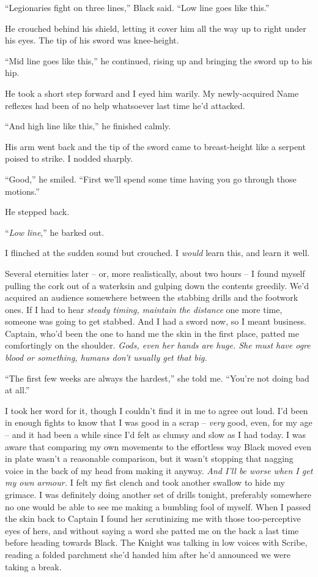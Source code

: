\documentclass[12pt, openany]{book}
\begin{document}
“Legionaries fight on three lines,” Black said. “Low line goes like this.”

He crouched behind his shield, letting it cover him all the way up to right under his eyes. The tip of his sword was knee-height.

“Mid line goes like this,” he continued, rising up and bringing the sword up to his hip.

He took a short step forward and I eyed him warily. My newly-acquired Name reflexes had been of no help whatsoever last time he’d attacked.

“And high line like this,” he finished calmly.

His arm went back and the tip of the sword came to breast-height like a serpent poised to strike. I nodded sharply.

“Good,” he smiled. “First we’ll spend some time having you go through those motions.”

He stepped back.

“\textit{Low line},” he barked out.

I flinched at the sudden sound but crouched. I \textit{would} learn this, and learn it well.

Several eternities later – or, more realistically, about two hours – I found myself pulling the cork out of a waterksin and gulping down the contents greedily. We’d acquired an audience somewhere between the stabbing drills and the footwork ones. If I had to hear \textit{steady timing, maintain the distance} one more time, someone was going to get stabbed. And I had a sword now, so I meant business. Captain, who’d been the one to hand me the skin in the first place, patted me comfortingly on the shoulder.\textit{ Gods, even her hands are huge. She must have ogre blood or something, humans don’t usually get that big.}

“The first few weeks are always the hardest,” she told me. “You’re not doing bad at all.”

I took her word for it, though I couldn’t find it in me to agree out loud. I’d been in enough fights to know that I was good in a scrap – \textit{very }good, even, for my age – and it had been a while since I’d felt as clumsy and slow as I had today. I was aware that comparing my own movements to the effortless way Black moved even in plate wasn’t a reasonable comparison, but it wasn’t stopping that nagging voice in the back of my head from making it anyway. \textit{And I’ll be worse when I get my own armour. }I felt my fist clench and took another swallow to hide my grimace. I was definitely doing another set of drills tonight, preferably somewhere no one would be able to see me making a bumbling fool of myself. When I passed the skin back to Captain I found her scrutinizing me with those too-perceptive eyes of hers, and without saying a word she patted me on the back a last time before heading towards Black. The Knight was talking in low voices with Scribe, reading a folded parchment she’d handed him after he’d announced we were taking a break.
\end{document}
